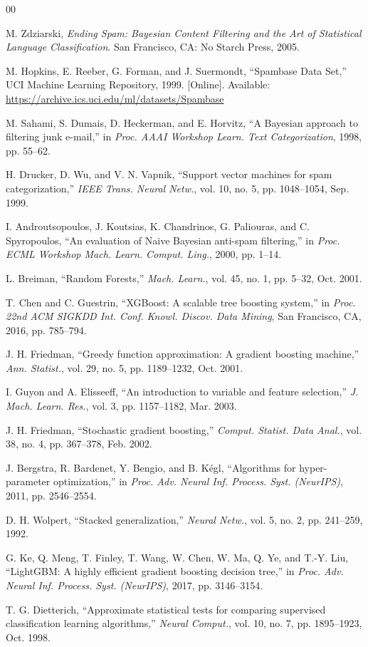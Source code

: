 \documentclass[conference]{IEEEtran}
\begin{document}
\begin{thebibliography}{00}

M. Zdziarski, \textit{Ending Spam: Bayesian Content Filtering and the Art of Statistical Language Classification}. San Francisco, CA: No Starch Press, 2005.

M. Hopkins, E. Reeber, G. Forman, and J. Suermondt, ``Spambase Data Set,'' UCI Machine Learning Repository, 1999. [Online]. Available: \url{https://archive.ics.uci.edu/ml/datasets/Spambase}

M. Sahami, S. Dumais, D. Heckerman, and E. Horvitz, ``A Bayesian approach to filtering junk e-mail,'' in \textit{Proc. AAAI Workshop Learn. Text Categorization}, 1998, pp. 55--62.

H. Drucker, D. Wu, and V. N. Vapnik, ``Support vector machines for spam categorization,'' \textit{IEEE Trans. Neural Netw.}, vol. 10, no. 5, pp. 1048--1054, Sep. 1999.

I. Androutsopoulos, J. Koutsias, K. Chandrinos, G. Paliouras, and C. Spyropoulos, ``An evaluation of Naive Bayesian anti-spam filtering,'' in \textit{Proc. ECML Workshop Mach. Learn. Comput. Ling.}, 2000, pp. 1--14.

L. Breiman, ``Random Forests,'' \textit{Mach. Learn.}, vol. 45, no. 1, pp. 5--32, Oct. 2001.

T. Chen and C. Guestrin, ``XGBoost: A scalable tree boosting system,'' in \textit{Proc. 22nd ACM SIGKDD Int. Conf. Knowl. Discov. Data Mining}, San Francisco, CA, 2016, pp. 785--794.

J. H. Friedman, ``Greedy function approximation: A gradient boosting machine,'' \textit{Ann. Statist.}, vol. 29, no. 5, pp. 1189--1232, Oct. 2001.

I. Guyon and A. Elisseeff, ``An introduction to variable and feature selection,'' \textit{J. Mach. Learn. Res.}, vol. 3, pp. 1157--1182, Mar. 2003.

J. H. Friedman, ``Stochastic gradient boosting,'' \textit{Comput. Statist. Data Anal.}, vol. 38, no. 4, pp. 367--378, Feb. 2002.

J. Bergstra, R. Bardenet, Y. Bengio, and B. K\'{e}gl, ``Algorithms for hyper-parameter optimization,'' in \textit{Proc. Adv. Neural Inf. Process. Syst. (NeurIPS)}, 2011, pp. 2546--2554.

D. H. Wolpert, ``Stacked generalization,'' \textit{Neural Netw.}, vol. 5, no. 2, pp. 241--259, 1992.

G. Ke, Q. Meng, T. Finley, T. Wang, W. Chen, W. Ma, Q. Ye, and T.-Y. Liu, ``LightGBM: A highly efficient gradient boosting decision tree,'' in \textit{Proc. Adv. Neural Inf. Process. Syst. (NeurIPS)}, 2017, pp. 3146--3154.

T. G. Dietterich, ``Approximate statistical tests for comparing supervised classification learning algorithms,'' \textit{Neural Comput.}, vol. 10, no. 7, pp. 1895--1923, Oct. 1998.

\end{thebibliography}
\end{document}
